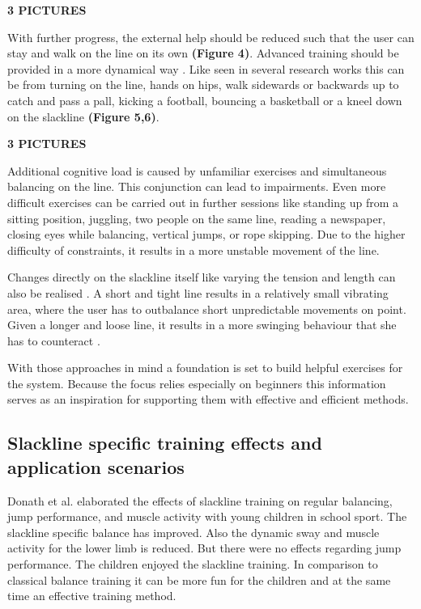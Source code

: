 \textbf{3 PICTURES} \cite{Kroiss2007-ab}

With further progress, the external help should be reduced such that the user can stay and walk on the line on its own \textbf{(Figure 4)}. Advanced training should be provided in a more dynamical way \cite{Thomann2013-aa}. Like seen in several research works \cite{Donath2013-kk} \cite{Donath2016-gm} \cite{Keller2012-xh} \cite{Granacher2010-ow} \cite{Pfusterschmied2013-yy} this can be from turning on the line, hands on hips, walk sidewards or backwards up to catch and pass a pall, kicking a football, bouncing a basketball or a kneel down on the slackline \textbf{(Figure 5,6)}. 

\textbf{3 PICTURES} \cite{Kroiss2007-ab}

Additional cognitive load is caused by unfamiliar exercises and simultaneous balancing on the line. This conjunction can lead to impairments. Even more difficult exercises can be carried out in further sessions like standing up from a sitting position, juggling, two people on the same line, reading a newspaper, closing eyes while balancing, vertical jumps, or rope skipping. Due to the higher difficulty of constraints, it results in a more unstable movement of the line.

 Changes directly on the slackline itself like varying the tension and length can also be realised \cite{Pfusterschmied2013-kq} \cite{Keller2012-xh} \cite{Pfusterschmied2013-yy}. A short and tight line results in a relatively small vibrating area, where the user has to outbalance short unpredictable movements on point. Given a longer and loose line, it results in a more swinging behaviour that she has to counteract \cite{Kroiss2007-ab}. 
 
With those approaches in mind a foundation is set to build helpful exercises for the system. Because the focus relies especially on beginners this information serves as an inspiration for supporting them with effective and efficient methods.

\subsection{Slackline specific training effects and application scenarios}

Donath et al. \cite{Donath2013-kk} elaborated the effects of slackline training on regular balancing, jump performance, and muscle activity with young children in school sport. The slackline specific balance has improved. Also the dynamic sway and muscle activity for the lower limb is reduced. But there were no effects regarding jump performance. The children enjoyed the slackline training. In comparison to classical balance training it can be more fun for the children and at the same time an effective training method.

